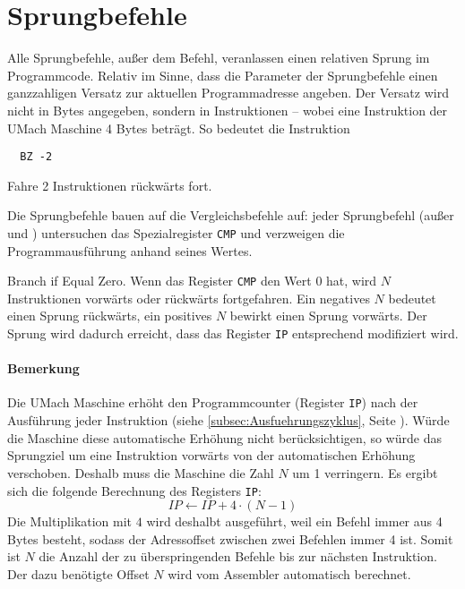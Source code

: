 \section{Sprungbefehle}
\label{sec:Sprungbefehle}

Alle Sprungbefehle, außer dem  Befehl, veranlassen einen 
relativen Sprung im Programmcode. Relativ im Sinne, dass die Parameter der
Sprungbefehle einen ganzzahligen Versatz zur aktuellen Programmadresse angeben.
Der Versatz wird nicht in Bytes angegeben, sondern in
Instruktionen -- wobei eine Instruktion der UMach Maschine 4 Bytes beträgt.
So bedeutet die Instruktion 
\begin{lstlisting}
  BZ -2
\end{lstlisting}
\glqq Fahre 2 Instruktionen rückwärts fort\grqq.


Die Sprungbefehle bauen auf die Vergleichsbefehle auf:
jeder Sprungbefehl (außer  und ) untersuchen das
Spezialregister \texttt{CMP} und verzweigen die Programmausführung anhand seines
Wertes.


\glqq Branch if Equal Zero\grqq.
Wenn das Register \texttt{CMP} den Wert $0$ hat, wird $N$ Instruktionen vorwärts
oder rückwärts fortgefahren. Ein negatives $N$ bedeutet einen Sprung rückwärts,
ein positives $N$ bewirkt einen Sprung vorwärts. Der Sprung wird dadurch
erreicht, dass das Register \texttt{IP} entsprechend modifiziert wird.

\paragraph{Bemerkung}
Die UMach Maschine erhöht den Programmcounter (Register \texttt{IP}) nach
der Ausführung jeder Instruktion
(siehe \ref{subsec:Ausfuehrungszyklus}, Seite
\pageref{subsec:Ausfuehrungszyklus}).
Würde die Maschine diese automatische Erhöhung nicht berücksichtigen, so würde
das Sprungziel um eine Instruktion vorwärts von der automatischen
Erhöhung verschoben. Deshalb muss die Maschine die Zahl $N$ um 1 verringern. Es
ergibt sich die folgende Berechnung des Registers \texttt{IP}:
\[
    IP \gets IP + 4 \cdot (N - 1)
\]
Die Multiplikation mit $4$ wird deshalbt ausgeführt, weil ein Befehl immer aus 4
Bytes besteht, sodass der Adressoffset zwischen zwei Befehlen immer 4 ist. Somit
ist $N$ die Anzahl der zu überspringenden Befehle bis zur nächsten Instruktion.
Der dazu benötigte Offset $N$ wird vom Assembler automatisch berechnet. 

